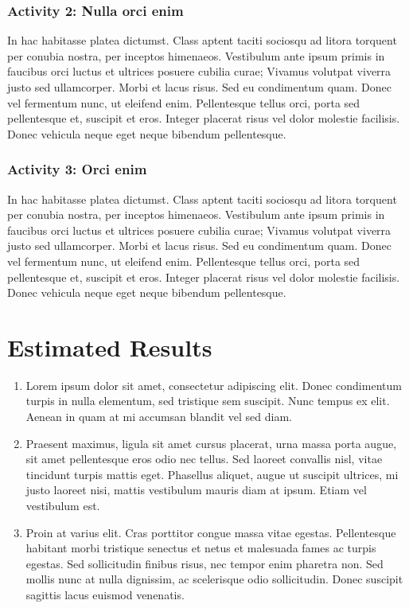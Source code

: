 \subsubsection*{Activity 2: Nulla orci enim}

In hac habitasse platea dictumst. Class aptent taciti sociosqu ad litora torquent per conubia nostra, per inceptos himenaeos. Vestibulum ante ipsum primis in faucibus orci luctus et ultrices posuere cubilia curae; Vivamus volutpat viverra justo sed ullamcorper. Morbi et lacus risus. Sed eu condimentum quam. Donec vel fermentum nunc, ut eleifend enim. Pellentesque tellus orci, porta sed pellentesque et, suscipit et eros. Integer placerat risus vel dolor molestie facilisis. Donec vehicula neque eget neque bibendum pellentesque.

\subsubsection*{Activity 3: Orci enim}

In hac habitasse platea dictumst. Class aptent taciti sociosqu ad litora torquent per conubia nostra, per inceptos himenaeos. Vestibulum ante ipsum primis in faucibus orci luctus et ultrices posuere cubilia curae; Vivamus volutpat viverra justo sed ullamcorper. Morbi et lacus risus. Sed eu condimentum quam. Donec vel fermentum nunc, ut eleifend enim. Pellentesque tellus orci, porta sed pellentesque et, suscipit et eros. Integer placerat risus vel dolor molestie facilisis. Donec vehicula neque eget neque bibendum pellentesque.



\section{Estimated Results}

\begin{enumerate}
	\item Lorem ipsum dolor sit amet, consectetur adipiscing elit. Donec condimentum turpis in nulla elementum, sed tristique sem suscipit. Nunc tempus ex elit. Aenean in quam at mi accumsan blandit vel sed diam. 
	\item Praesent maximus, ligula sit amet cursus placerat, urna massa porta augue, sit amet pellentesque eros odio nec tellus. Sed laoreet convallis nisl, vitae tincidunt turpis mattis eget. Phasellus aliquet, augue ut suscipit ultrices, mi justo laoreet nisi, mattis vestibulum mauris diam at ipsum. Etiam vel vestibulum est. 
	\item Proin at varius elit. Cras porttitor congue massa vitae egestas. Pellentesque habitant morbi tristique senectus et netus et malesuada fames ac turpis egestas. Sed sollicitudin finibus risus, nec tempor enim pharetra non. Sed mollis nunc at nulla dignissim, ac scelerisque odio sollicitudin. Donec suscipit sagittis lacus euismod venenatis.

\end{enumerate}

